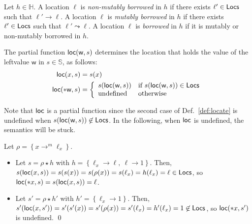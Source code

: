 \begin{definition}
  Let $h\in\mathbb{H}$. %
  A location $\ell$ is \emph{non-mutably borrowed} in $h$
  if there exists $\ell'\in\mathsf{Locs}$ such that $\ell'\to\ell$.
  A location $\ell$ is \emph{mutably borrowed} in $h$
  if there exists $\ell'\in\mathsf{Locs}$ such that $\ell'\leadsto\ell$.
  A location $\ell$ is \emph{borrowed} in $h$
  if it is mutably or non-mutably borrowed in $h$.
\end{definition}


\begin{definition}[Locate]\label{def:locate}
  The partial function $\mathsf{loc}(\mathsf{w},s)$ determines the location that holds
  the value of the leftvalue $\mathsf{w}$ in $s\in\mathbb{S}$, as follows:
  \begin{align*}
    \mathsf{loc}(x,s) &= s(x)\\
    \mathsf{loc}(*\mathsf{w},s) &= \left\{\begin{array}{ll}
      s(\mathsf{loc}(\mathsf{w},s)) & \text{if } s(\mathsf{loc}(\mathsf{w},s)) \in \mathsf{Locs}\\
      \text{undefined} & \text{otherwise}
    \end{array}\right.
  \end{align*}
\end{definition}

\noindent
Note that $\mathsf{loc}$ is a partial function since the second case of
Def.~\ref{def:locate} is undefined when
$s(\mathsf{loc}(\mathsf{w},s))\not\in\mathsf{Locs}$. In the following, when $\mathsf{loc}$ is undefined, the
semantics will be stuck.

\begin{example}
  Let $\rho = \left\{x\rightarrow^m\ell_x\right\}$.
  \begin{itemize}
    \item Let $s = \rho\star h$ with
    $h = \left\{\ell_x\rightarrow\ell,\ \ell\rightarrow 1\right\}$.
    Then, $s(\mathsf{loc}(x,s)) = s(s(x)) = s(\rho(x)) = s(\ell_x) =
    h(\ell_x) = \ell\in\mathsf{Locs}$, so
    $\mathsf{loc}(\mathtt{*}x,s)= s(\mathsf{loc}(x,s)) = \ell$.
    \item Let $s' = \rho\star h'$ with
    $h' = \left\{\ell_x\rightarrow 1\right\}$. Then,
    $s'(\mathsf{loc}(x,s')) = s'(s'(x)) = s'(\rho(x)) = s'(\ell_x) =
    h'(\ell_x) = 1 \not\in\mathsf{Locs}$, so $\mathsf{loc}(\mathtt{*}x,s')$ is undefined.
    \qed
  \end{itemize}
\end{example}

